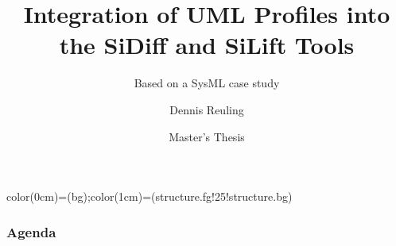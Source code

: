 \documentclass[10pt]{beamer}
\title[UML Profiles Integration]{Integration of UML Profiles into the
SiDiff and SiLift Tools}%
\subtitle[Master's Thesis]{Based on a SysML case study}
\author[Dennis Reuling]{Dennis Reuling}
\date[24.09.2013]{Master's Thesis}
\begin{document}
 {color(0cm)=(bg);color(1cm)=(structure.fg!25!structure.bg)}

\begingroup
\makeatletter
\beamertemplatenavigationsymbolsempty
\makeatother
\begin{frame}[plain]
    \titlepage
\end{frame}
\endgroup

\setcounter{tocdepth}{1}

\begingroup
\makeatletter
{}
\makeatother
\begin{frame}
  \frametitle{Agenda}
  \tableofcontents
\end{frame}
\endgroup
\end{document}

